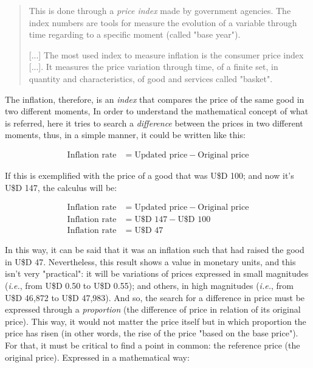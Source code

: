 \documentclass[12pt,a4paper,twoside]{book}
\begin{document}
\begin{quotation}
This is done through a \textit{price index} made by government agencies. The index numbers are tools for measure the evolution of a variable through time regarding to a specific moment (called "base year").

[...] The most used index to measure inflation is the consumer price index [...]. It measures the price variation through time, of a finite set, in quantity and characteristics, of good and services called "basket". \cite[pp. 55-56]{nappa:calc-financ}
\end{quotation}

The inflation, therefore, is an \textit{index} that compares the price of the same good in two different moments, In order to understand the mathematical concept of what is referred, here it tries to search a \textit{difference} between the prices in two different moments, thus, in a simple manner, it could be written like this:

\begin{align*}
\text{Inflation rate} &= \text{Updated price} - \text{Original price}
\end{align*}

If this is exemplified with the price of a good that was U\$D 100; and now it's U\$D 147, the calculus will be:

\begin{align*}
\text{Inflation rate} &= \text{Updated price} - \text{Original price} \\
\text{Inflation rate} &= \text{U\$D } 147 - \text{U\$D } 100 \\
\text{Inflation rate} &= \text{U\$D } 47
\end{align*}

In this way, it can be said that it was an inflation such that had raised the good in U\$D 47. Nevertheless, this result shows a value in monetary units, and this isn't very "practical": it will be variations of prices expressed in small magnitudes (\textit{i.e.}, from U\$D 0.50 to U\$D 0.55); and others, in high magnitudes (\textit{i.e.}, from U\$D 46,872 to U\$D 47,983). And so, the search for a difference in price must be expressed through a \textit{proportion} (the difference of price in relation of its original price). This way, it would not matter the price itself	 but in which proportion the price has risen (in other words, the rise of the price "based on the base price"). For that, it must be critical to find a point in common: the reference price (the original price). Expressed in a mathematical way:
\end{document}
